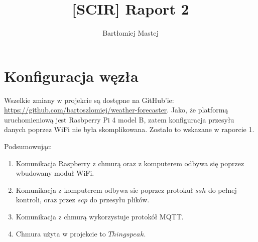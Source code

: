 \documentclass[runningheads]{llncs}
\begin{document}
%
\title{[SCIR] Raport 2}
%

\author{Bartłomiej Mastej}
%
%

%
\maketitle              %
%
%
%
%
\section{Konfiguracja węzła}
Wszelkie zmiany w projekcie są dostępne na GitHub'ie: \url{https://github.com/bartoszlomiej/weather-forecaster}.
Jako, że platformą uruchomieniową jest Rasbperry Pi 4 model B, zatem konfiguracja przesyłu danych poprzez WiFi nie była skomplikowana. Zostało to wskazane w raporcie 1.

Podsumowując:
\begin{enumerate}
\item Komunikacja Raspberry z chmurą oraz z komputerem odbywa się poprzez wbudowany moduł WiFi.
\item Komunikacja z komputerem odbywa sie poprzez protokuł $ssh$ do pełnej kontroli, oraz przez $scp$ do przesyłu plików.
\item Komunikacja z chmurą wykorzystuje protokół MQTT.
\item Chmura użyta w projekcie to $Thingspeak$.
\end{enumerate}
\end{document}
